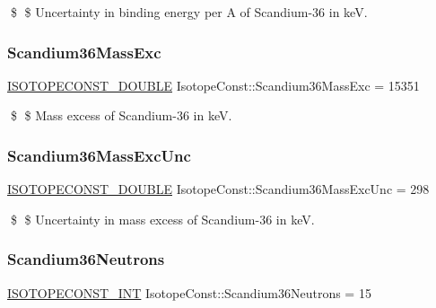 \$ \$ Uncertainty in binding energy per A of Scandium-\/36 in keV. \mbox{\label{group___isotope_const-_scandium-_sc36_ga89d4d0eef018f65b2b36e141d04d73cd}} 
\subsubsection{\texorpdfstring{Scandium36\+Mass\+Exc}{Scandium36MassExc}}
{\footnotesize\ttfamily \mbox{\hyperlink{group___isotope_const-_macros_ga8f45a7272ce02c0b4c65c44636ed719a}{I\+S\+O\+T\+O\+P\+E\+C\+O\+N\+S\+T\+\_\+\+D\+O\+U\+B\+LE}} Isotope\+Const\+::\+Scandium36\+Mass\+Exc = 15351}

\$ \$ Mass excess of Scandium-\/36 in keV. \mbox{\label{group___isotope_const-_scandium-_sc36_gade14fd62b3ef4deba6b87d57d0f9bd1c}} 
\subsubsection{\texorpdfstring{Scandium36\+Mass\+Exc\+Unc}{Scandium36MassExcUnc}}
{\footnotesize\ttfamily \mbox{\hyperlink{group___isotope_const-_macros_ga8f45a7272ce02c0b4c65c44636ed719a}{I\+S\+O\+T\+O\+P\+E\+C\+O\+N\+S\+T\+\_\+\+D\+O\+U\+B\+LE}} Isotope\+Const\+::\+Scandium36\+Mass\+Exc\+Unc = 298}

\$ \$ Uncertainty in mass excess of Scandium-\/36 in keV. \mbox{\label{group___isotope_const-_scandium-_sc36_ga23ac7a6e2eacef79f00eb701c9d0c149}} 
\subsubsection{\texorpdfstring{Scandium36\+Neutrons}{Scandium36Neutrons}}
{\footnotesize\ttfamily \mbox{\hyperlink{group___isotope_const-_macros_ga5f18360b3e99483a35c32d789e62621c}{I\+S\+O\+T\+O\+P\+E\+C\+O\+N\+S\+T\+\_\+\+I\+NT}} Isotope\+Const\+::\+Scandium36\+Neutrons = 15}

